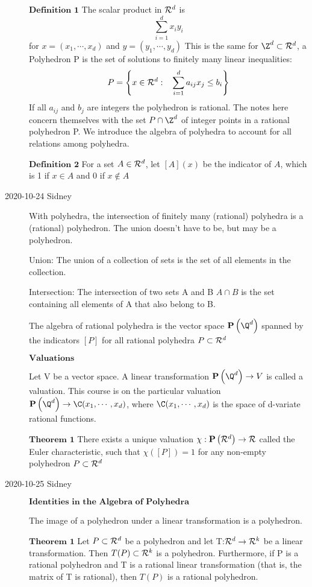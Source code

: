 \begin{description}
$\textbf{Definition 1}$ The scalar product in $\mathcal{R}^d$ is 
$$\sum^d_{i=1}x_iy_i$$
for $x=(x_1,\cdots , x_d)$ and $y=(y_1,\cdots , y_d)$
This is the same for $\Z^d\subset\R^d$, a Polyhedron P is the set of solutions to finitely many linear inequalities:
$$P=\left\lbrace x\in\mathcal{R}^d:\hspace{3mm}\sum^d_{i=1}a_{ij}x_j\leq b_i \right\rbrace$$
If all $a_{ij}$ and $b_j$ are integers the polyhedron is rational. The notes here concern themselves with the set $P\cap\Z^d$ of integer points in a rational polyhedron P. We introduce the algebra of polyhedra to account for all relations among polyhedra. 

$\textbf{Definition 2}$ For a set $A\in\mathcal{R}^d$, let $[A](x)$ be the indicator of $A$, which is 1 if $x\in A$ and 0 if $x\notin A$

\item[2020-10-24 Sidney]

With polyhedra, the intersection of finitely many (rational) polyhedra is a (rational) polyhedron. The union doesn't have to be, but may be a polyhedron. 

Union: The union of a collection of sets is the set of all elements in the collection.

Intersection: The intersection of two sets A and B $A\cap B$ is the set containing all elements of A that also belong to B.

The algebra of rational polyhedra is the vector space $\textbf{P}\left(\Q^d\right)$ spanned by the indicators $[P]$ for all rational polyhedra $P\subset \mathcal{R}^d$

$\textbf{Valuations}$

Let V be a vector space. A linear transformation $\textbf{P}\left(\Q^d\right)\rightarrow V$ is called a valuation. This course is on the particular valuation $\textbf{P}\left(\Q^d\right)\rightarrow \C (x_1,\cdots ,x_d)$, where $\C (x_1,\cdots ,x_d)$ is the space of d-variate rational functions.

$\textbf{Theorem 1}$ There exists a unique valuation $\chi:\textbf{P}\left(\mathcal{R}^d\right)\rightarrow\mathcal{R}$ called the Euler characteristic, such that $\chi([P])=1$ for any non-empty polyhedron $P\subset\mathcal{R}^d$

\item[2020-10-25 Sidney]

$\textbf{Identities in the Algebra of Polyhedra}$

The image of a polyhedron under a linear transformation is a polyhedron.

$\textbf{Theorem 1}$ Let $P\subset\mathcal{R}^d$ be a polyhedron and let T:$\mathcal{R}^d\rightarrow\mathcal{R}^k$ be a linear transformation. Then $T(P)\subset\mathcal{R}^k$ is a polyhedron. Furthermore, if P is a rational polyhedron and T is a rational linear transformation (that is, the matrix of T is rational), then $T(P)$ is a rational polyhedron.


\end{description}
